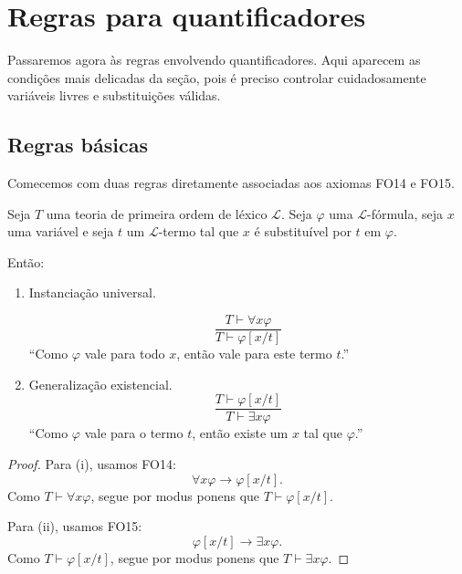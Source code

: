 \section{Regras para quantificadores}
\label{sec:regrasParaQuantificadores}
Passaremos agora às regras envolvendo quantificadores.
Aqui aparecem as condições mais delicadas da seção, pois é preciso controlar cuidadosamente variáveis livres e substituições válidas.

\subsection{Regras básicas}

Comecemos com duas regras diretamente associadas aos axiomas FO14 e FO15.

\begin{metaproposition}\label{mprop:instanciacaoUniversalGeneralizacaoExistencial}
    Seja $T$ uma teoria de primeira ordem de léxico $\mathcal L$.
    Seja $\varphi$ uma $\mathcal L$-fórmula, seja $x$ uma variável e seja $t$ um $\mathcal L$-termo tal que $x$ é substituível por $t$ em $\varphi$.

    Então:

    \begin{enumerate}[label=(\roman*)]
        \item Instanciação universal.
        
        \[
        \frac{T\vdash \forall x\varphi}
             {T\vdash \varphi[x/t]}
        \]
        ``Como $\varphi$ vale para todo $x$, então vale para este termo $t$.''
        \item Generalização existencial.
        \[
            \frac{T\vdash \varphi[x/t]}
             {T\vdash \exists x\varphi}
        \]
        ``Como $\varphi$ vale para o termo $t$, então existe um $x$ tal que $\varphi$.''
    \end{enumerate}
\end{metaproposition}

\begin{proof}
    Para (i), usamos FO14:
    \[
        \forall x\varphi\rightarrow\varphi[x/t].
    \]
    Como $T\vdash \forall x\varphi$, segue por modus ponens que $T\vdash \varphi[x/t]$.

    Para (ii), usamos FO15:
    \[
        \varphi[x/t]\rightarrow\exists x\varphi.
    \]
    Como $T\vdash \varphi[x/t]$, segue por modus ponens que $T\vdash \exists x\varphi$.
\end{proof}


